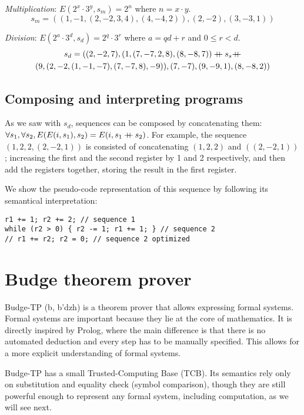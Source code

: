 \documentclass{article}
\newcommand\doubleplus{\mathbin{{+}\mspace{-8mu}{+}}}
\begin{document}
\textit{Multiplication}: $E(2^x \cdot 3^y, s_m) = 2^n$ where $n = x \cdot y$.
$$s_m = ((1, -1, (2, -2, 3, 4), (4, -4, 2)), (2, -2), (3, -3, 1))$$

\textit{Division}: $E(2^a \cdot 3^d, s_d) = 2^q \cdot 3^r$ where $a = qd + r$ and $0 \leq r < d$.
\begin{gather*}
s_d = ((2, -2, 7), (1, (7, -7, 2, 8), (8, -8, 7)) \doubleplus s_s \doubleplus \\ (9, (2, -2, (1, -1, -7), (7, -7, 8), -9)), (7, -7), (9, -9, 1), (8, -8, 2))
\end{gather*}

\subsection{Composing and interpreting programs}

As we saw with $s_d$, sequences can be composed by concatenating them: $\forall s_1, \forall s_2, E(E(i, s_1), s_2) = E(i, s_1 \doubleplus s_2)$. For example, the sequence $(1, 2, 2, (2, -2, 1))$ is consisted of concatenating $(1, 2, 2)$ and $((2, -2, 1))$; increasing the first and the second register by 1 and 2 respectively, and then add the registers together, storing the result in the first register.

We show the pseudo-code representation of this sequence by following its semantical interpretation:

\begin{verbatim}
r1 += 1; r2 += 2; // sequence 1
while (r2 > 0) { r2 -= 1; r1 += 1; } // sequence 2
// r1 += r2; r2 = 0; // sequence 2 optimized
\end{verbatim}

\section{Budge theorem prover}

Budge-TP (b\textturnv\textdyoghlig, b'dzh) is a theorem prover that allows expressing formal systems. Formal systems are important because they lie at the core of mathematics. It is directly inspired by Prolog\cite{b5}, where the main difference is that there is no automated deduction and every step has to be manually specified. This allows for a more explicit understanding of formal systems.

Budge-TP has a small Trusted-Computing Base (TCB). Its semantics rely only on substitution and equality check (symbol comparison), though they are still powerful enough to represent any formal system, including computation, as we will see next.
\end{document}
